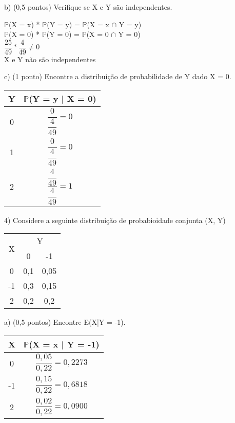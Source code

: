 \documentclass[12pt,a4paper]{article}
\begin{document}
	\vspace{1cm}
	b) (0,5 pontos) Verifique se X e Y são independentes.\\
	\begin{center}
			$\mathbb{P}$(X = x) * $\mathbb{P}$(Y = y) = $\mathbb{P}$(X = x $\cap$ Y = y)
			\vspace{0.5cm}\\
			$\mathbb{P}$(X = 0) * $\mathbb{P}$(Y = 0) = $\mathbb{P}$(X = 0 $\cap$ Y = 0)\\
			\vspace{0.25cm}
			$\dfrac{25}{49} * \dfrac{4}{49} \neq 0$\\
			\vspace{1cm}
			X e Y não são independentes
	\end{center}
	\vspace{1cm}
	c) (1 ponto) Encontre a distribuição de probabilidade de Y dado X = 0.\\
	\begin{center}
		\begin{tabular}{cc}
			Y & $\mathbb{P}$(Y = y | X = 0)\\ \midrule
			0 & $\dfrac{0}{\dfrac{4}{49}} = 0$\\ \midrule
			1 & $\dfrac{0}{\dfrac{4}{49}} = 0$\\ \midrule
			2 & $\dfrac{\dfrac{4}{49}}{\dfrac{4}{49}} = 1$\\ \midrule
		\end{tabular}
	\end{center}
	\vspace{1cm}
	4) Considere a seguinte distribuição de probabioidade conjunta (X, Y)
	\vspace{0.25cm}\\
	\begin{center}
		\begin{tabular}{|c|c|c|}\hline
			\multirow{2}{*}{X} & \multicolumn{2}{c|}{Y}\\ \cline{2-3}
			& 0 & -1\\ \hline
			0 & 0,1 & 0,05\\ \hline
			-1 & 0,3 & 0,15\\ \hline
			2 & 0,2 & 0,2\\ \hline
		\end{tabular}
	\end{center}
	\vspace{0.25cm}
	a) (0,5 pontos) Encontre E(X|Y = -1).\\
	\vspace{0.5cm}
	\begin{center}
		\begin{tabular}{cc}
			X & $\mathbb{P}$(X = x | Y = -1)\\ \midrule
			0 & $\dfrac{0,05}{0,22} = 0,2273$\\ \midrule
			-1 & $\dfrac{0,15}{0,22} = 0,6818$\\ \midrule
			2 & $\dfrac{0,02}{0,22} = 0,0900$\\ \midrule
		\end{tabular}
	\end{center}
\end{document}
